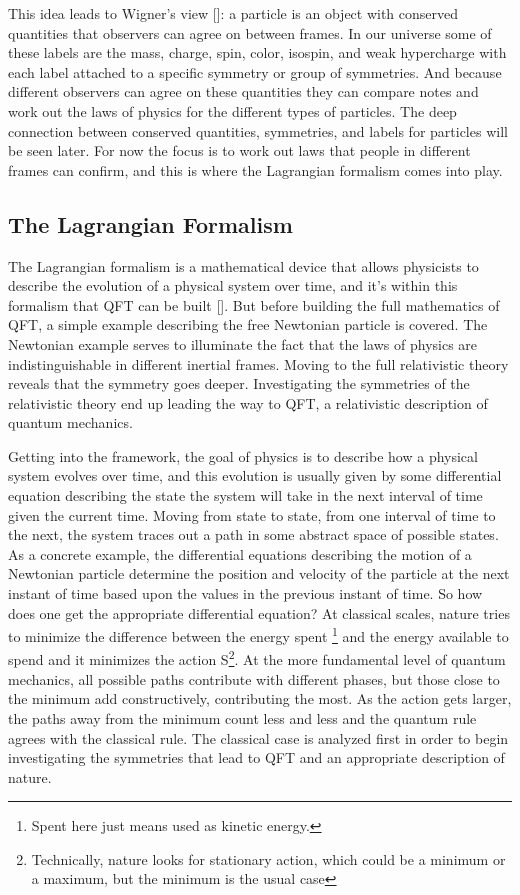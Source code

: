 This idea leads to Wigner's view [\cite{wigner}]: a particle is an object with conserved quantities that observers can agree on between frames. In our universe some of these labels are the mass, charge, spin, color, isospin, and weak hypercharge with each label attached to a specific symmetry or group of symmetries. And because different observers can agree on these quantities they can compare notes and work out the laws of physics for the different types of particles. The deep connection between conserved quantities, symmetries, and labels for particles will be seen later. For now the focus is to work out laws that people in different frames can confirm, and this is where the Lagrangian formalism comes into play. 

\subsection{The Lagrangian Formalism}

The Lagrangian formalism is a mathematical device that allows physicists to describe the evolution of a physical system over time, and it's within this formalism that QFT can be built [\cite{peskin,qftam}]. But before building the full mathematics of QFT, a simple example describing the free Newtonian particle is covered. The Newtonian example serves to illuminate the fact that the laws of physics are indistinguishable in different inertial frames. Moving to the full relativistic theory reveals that the symmetry goes deeper. Investigating the symmetries of the relativistic theory end up leading the way to QFT, a relativistic description of quantum mechanics.

Getting into the framework, the goal of physics is to describe how a physical system evolves over time, and this evolution is usually given by some differential equation describing the state the system will take in the next interval of time given the current time. Moving from state to state, from one interval of time to the next, the system traces out a path in some abstract space of possible states. As a concrete example, the differential equations describing the motion of a Newtonian particle determine the position and velocity of the particle at the next instant of time based upon the values in the previous instant of time. So how does one get the appropriate differential equation? At classical scales, nature tries to minimize the difference between the energy spent \footnote{Spent here just means used as kinetic energy.} and the energy available to spend and it minimizes the action S\footnote{Technically, nature looks for stationary action, which could be a minimum or a maximum, but the minimum is the usual case}. At the more fundamental level of quantum mechanics, all possible paths contribute with different phases, but those close to the minimum add constructively, contributing the most. As the action gets larger, the paths away from the minimum count less and less and the quantum rule agrees with the classical rule. The classical case is analyzed first in order to begin investigating the symmetries that lead to QFT and an appropriate description of nature. 

